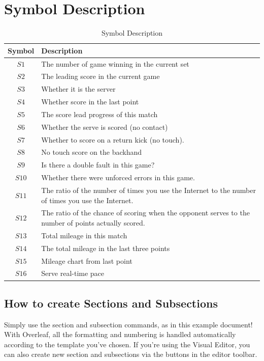 \documentclass{article}
\begin{document}
\section{Symbol Description}
\begin{table}[H]
\centering
\begin{tabular}{|c|l|}
\hline
\textbf{Symbol} & \textbf{Description} \\ \hline
$S1$ & The number of game winning in the current set \\ \hline
$S2$ & The leading score in the current game \\ \hline
$S3$ & Whether it is the server \\ \hline
$S4$ & Whether score in the last point \\ \hline
$S5$ & The score lead progress of this match\\ \hline
$S6$ & Whether the serve is scored (no contact) \\ \hline
$S7$ & Whether to score on a return kick (no touch). \\ \hline
$S8$ & No touch score on the backhand \\ \hline
$S9$ & Is there a double fault in this game? \\ \hline
$S10$ & Whether there were unforced errors in this game. \\ \hline
$S11$ & The ratio of the number of times you use the Internet to the number of times you use the Internet. \\ \hline
$S12$ & The ratio of the chance of scoring when the opponent serves to the number of points actually scored. \\ \hline
$S13$ & Total mileage in this match \\ \hline
$S14$ & The total mileage in the last three points \\ \hline
$S15$ & Mileage chart from last point \\ \hline
$S16$ & Serve real-time pace \\ \hline
\end{tabular}
\caption{Symbol Description}
\end{table}


\subsection{How to create Sections and Subsections}
Simply use the section and subsection commands, as in this example document! With Overleaf, all the formatting and numbering is handled automatically according to the template you've chosen. If you're using the Visual Editor, you can also create new section and subsections via the buttons in the editor toolbar.
\end{document}
